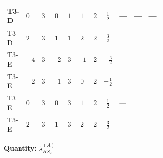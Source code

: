 \documentclass[8pt]{article}
\begin{document}
\begin{landscape}
\begin{longtable}{@{}llcccccc >{\raggedright\arraybackslash}p{0.21\linewidth} >{\raggedright\arraybackslash}p{0.21\linewidth} >{\raggedright\arraybackslash}p{0.21\linewidth}@{}}
\midrule
T3-D & $0$ & $3$ & $0$ & $1$ & $1$ & $2$ & $\frac{1}{2}$ & --- & --- & --- \\
\midrule
T3-D & $2$ & $3$ & $1$ & $1$ & $2$ & $2$ & $\frac{3}{2}$ & --- & --- & --- \\
\midrule
T3-E & $-4$ & $3$ & $-2$ & $3$ & $-1$ & $2$ & $-\frac{3}{2}$ & \scriptsize\adjustbox{max width=\linewidth}{$\begin{gathered} +{g_1}^2 \left(-4 {g_2}^2-\frac{15 {\lambda_{HS_2}^{(A)}}}{2}\right)\end{gathered}$} & \scriptsize\adjustbox{max width=\linewidth}{$\begin{gathered} -\frac{33 {g_2}^2 {\lambda_{HS_2}^{(A)}}}{2}\end{gathered}$} & \scriptsize\adjustbox{max width=\linewidth}{$\begin{gathered} +2 {\lambda_1} {\lambda_{HS_2}^{(A)}}\end{gathered}$} \\
\midrule
T3-E & $-2$ & $3$ & $-1$ & $3$ & $0$ & $2$ & $-\frac{1}{2}$ & --- & \scriptsize\adjustbox{max width=\linewidth}{$\begin{gathered} -\frac{33 {g_2}^2 {\lambda_{HS_2}^{(A)}}}{2}\end{gathered}$} & \scriptsize\adjustbox{max width=\linewidth}{$\begin{gathered} +2 {\lambda_1} {\lambda_{HS_2}^{(A)}}\end{gathered}$} \\
\midrule
T3-E & $0$ & $3$ & $0$ & $3$ & $1$ & $2$ & $\frac{1}{2}$ & --- & \scriptsize\adjustbox{max width=\linewidth}{$\begin{gathered} -\frac{33 {g_2}^2 {\lambda_{HS_2}^{(A)}}}{2}\end{gathered}$} & \scriptsize\adjustbox{max width=\linewidth}{$\begin{gathered} +2 {\lambda_1} {\lambda_{HS_2}^{(A)}}\end{gathered}$} \\
\midrule
T3-E & $2$ & $3$ & $1$ & $3$ & $2$ & $2$ & $\frac{3}{2}$ & --- & \scriptsize\adjustbox{max width=\linewidth}{$\begin{gathered} -\frac{33 {g_2}^2 {\lambda_{HS_2}^{(A)}}}{2}\end{gathered}$} & \scriptsize\adjustbox{max width=\linewidth}{$\begin{gathered} +2 {\lambda_1} {\lambda_{HS_2}^{(A)}}\end{gathered}$} \\
\midrule
\bottomrule
\end{longtable}
\clearpage
\noindent\textbf{Quantity: }$\lambda_{HS_2}^{(A)}$\par\smallskip

\end{landscape}
\end{document}
